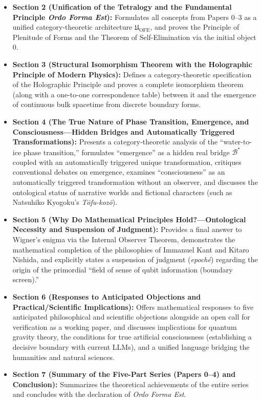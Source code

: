\documentclass[11pt,a4paper]{article}
\theoremstyle{definition}
\theoremstyle{plain}
\begin{document}
\begin{itemize}
    \item \textbf{Section 2 (Unification of the Tetralogy and the Fundamental Principle \textit{Ordo Forma Est}):} Formulates all concepts from Papers 0--3 as a unified category-theoretic architecture $\mathfrak{U}_{\mathrm{OFE}}$, and proves the Principle of Plenitude of Forms and the Theorem of Self-Elimination via the initial object $0$.
    \item \textbf{Section 3 (Structural Isomorphism Theorem with the Holographic Principle of Modern Physics):} Defines a category-theoretic specification of the Holographic Principle and proves a complete isomorphism theorem (along with a one-to-one correspondence table) between it and the emergence of continuous bulk spacetime from discrete boundary forms.
    \item \textbf{Section 4 (The True Nature of Phase Transition, Emergence, and Consciousness---Hidden Bridges and Automatically Triggered Transformations):} Presents a category-theoretic analysis of the ``water-to-ice phase transition,'' formulates ``emergence'' as a hidden real bridge $\mathcal{B}^*$ coupled with an automatically triggered unique transformation, critiques conventional debates on emergence, examines ``consciousness'' as an automatically triggered transformation without an observer, and discusses the ontological status of narrative worlds and fictional characters (such as Natsuhiko Kyogoku's \textit{T\=ofu-koz\=o}).
    \item \textbf{Section 5 (Why Do Mathematical Principles Hold?---Ontological Necessity and Suspension of Judgment):} Provides a final answer to Wigner's enigma via the Internal Observer Theorem, demonstrates the mathematical completion of the philosophies of Immanuel Kant and Kitaro Nishida, and explicitly states a suspension of judgment (\textit{epoch\'e}) regarding the origin of the primordial ``field of sense of qubit information (boundary screen).''
    \item \textbf{Section 6 (Responses to Anticipated Objections and Practical/Scientific Implications):} Offers mathematical responses to five anticipated philosophical and scientific objections alongside an open call for verification as a working paper, and discusses implications for quantum gravity theory, the conditions for true artificial consciousness (establishing a decisive boundary with current LLMs), and a unified language bridging the humanities and natural sciences.
    \item \textbf{Section 7 (Summary of the Five-Part Series (Papers 0--4) and Conclusion):} Summarizes the theoretical achievements of the entire series and concludes with the declaration of \textit{Ordo Forma Est}.
\end{itemize}
\end{document}
